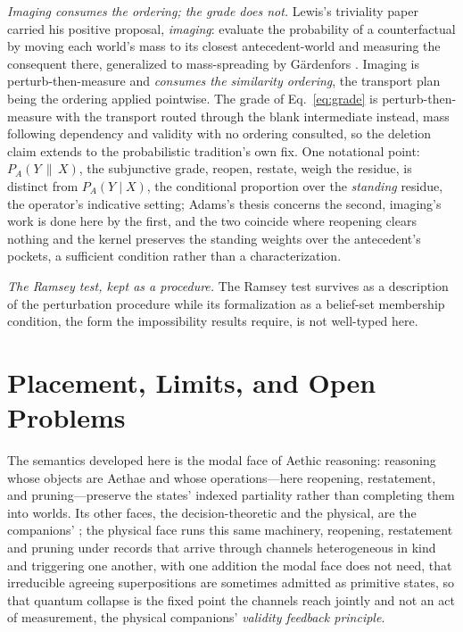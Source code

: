 \textit{Imaging consumes the ordering; the grade does not.} Lewis's triviality paper \parencite*{lewis1976} carried his positive proposal, \emph{imaging}: evaluate the probability of a counterfactual by moving each world's mass to its closest antecedent-world and measuring the consequent there, generalized to mass-spreading by G\"ardenfors \parencite*{gardenfors1982}. Imaging is perturb-then-measure and \emph{consumes the similarity ordering}, the transport plan being the ordering applied pointwise. The grade of Eq.~\eqref{eq:grade} is perturb-then-measure with the transport routed through the blank intermediate instead, mass following dependency and validity with no ordering consulted, so the deletion claim extends to the probabilistic tradition's own fix. One notational point: $P_A(Y \,\|\, X)$, the subjunctive grade, reopen, restate, weigh the residue, is distinct from $P_A(Y \mid X)$, the conditional proportion over the \emph{standing} residue, the operator's indicative setting; Adams's thesis concerns the second, imaging's work is done here by the first, and the two coincide where reopening clears nothing and the kernel preserves the standing weights over the antecedent's pockets, a sufficient condition rather than a characterization.

\textit{The Ramsey test, kept as a procedure.} The Ramsey test survives as a description of the perturbation procedure while its formalization as a belief-set membership condition, the form the impossibility results require, is not well-typed here.

\section{Placement, Limits, and Open Problems}\label{sec:placement}

\noindent The semantics developed here is the modal face of Aethic reasoning: reasoning whose objects are Aethae and whose operations---here reopening, restatement, and pruning---preserve the states' indexed partiality rather than completing them into worlds. Its other faces, the decision-theoretic and the physical, are the companions' \parencite{AethusDecision, AethusQuant}; the physical face runs this same machinery, reopening, restatement and pruning under records that arrive through channels heterogeneous in kind and triggering one another, with one addition the modal face does not need, that irreducible agreeing superpositions are sometimes admitted as primitive states, so that quantum collapse is the fixed point the channels reach jointly and not an act of measurement, the physical companions' \emph{validity feedback principle}.


